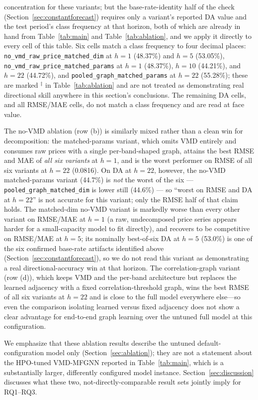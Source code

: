 \documentclass[journal]{IEEEtran}
\begin{document}
concentration for these variants; but the base-rate-identity half of the check (Section~\ref{sec:constantforecast}) requires only a variant's reported DA value and the test period's class frequency at that horizon, both of which are already in hand from Table~\ref{tab:main} and Table~\ref{tab:ablation}, and we apply it directly to every cell of this table. Six cells match a class frequency to four decimal places: \texttt{no\_vmd\_raw\_price\_matched\_dim} at $h=1$ (48.37\%) and $h=5$ (53.05\%), \texttt{no\_vmd\_raw\_price\_matched\_params} at $h=1$ (48.37\%), $h=10$ (44.21\%), and $h=22$ (44.72\%), and \texttt{pooled\_graph\_matched\_params} at $h=22$ (55.28\%); these are marked $^{\ddagger}$ in Table~\ref{tab:ablation} and are not treated as demonstrating real directional skill anywhere in this section's conclusions. The remaining DA cells, and all RMSE/MAE cells, do not match a class frequency and are read at face value.

The no-VMD ablation (row (b)) is similarly mixed rather than a clean win for decomposition: the matched-params variant, which omits VMD entirely and consumes raw prices with a single per-band-shaped graph, attains the best RMSE and MAE of \emph{all six variants} at $h=1$, and is the worst performer on RMSE of all six variants at $h=22$ (0.0816). On DA at $h=22$, however, the no-VMD matched-params variant (44.7\%) is \emph{not} the worst of the six --- \texttt{pooled\_graph\_matched\_dim} is lower still (44.6\%) --- so ``worst on RMSE and DA at $h=22$'' is not accurate for this variant; only the RMSE half of that claim holds. The matched-dim no-VMD variant is markedly worse than every other variant on RMSE/MAE at $h=1$ (a raw, undecomposed price series appears harder for a small-capacity model to fit directly), and recovers to be competitive on RMSE/MAE at $h=5$; its nominally best-of-six DA at $h=5$ (53.0\%) is one of the six confirmed base-rate artifacts identified above (Section~\ref{sec:constantforecast}), so we do not read this variant as demonstrating a real directional-accuracy win at that horizon. The correlation-graph variant (row (d)), which keeps VMD and the per-band architecture but replaces the learned adjacency with a fixed correlation-threshold graph, wins the best RMSE of all six variants at $h=22$ and is close to the full model everywhere else---so even the comparison isolating learned versus fixed adjacency does not show a clear advantage for end-to-end graph learning over the untuned full model at this configuration.

We emphasize that these ablation results describe the untuned default-configuration model only (Section~\ref{sec:ablation}); they are not a statement about the HPO-tuned VMD-MFGNN reported in Table~\ref{tab:main}, which is a substantially larger, differently configured model instance. Section~\ref{sec:discussion} discusses what these two, not-directly-comparable result sets jointly imply for RQ1--RQ3.
\end{document}
